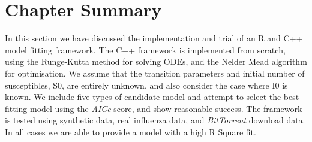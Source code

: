 \section{Chapter Summary}
In this section we have discussed the implementation and trial of an R
and C++ model fitting framework. The C++ framework is implemented from
scratch, using the Runge-Kutta method for solving ODEs, and the Nelder
Mead algorithm for optimisation. We assume that the transition
parameters and initial number of susceptibles, S0, are entirely
unknown, and also consider the case where I0 is known. We include five types of candidate
model and attempt to select the best fitting model using the
\emph{AICc} score, and show reasonable success. The framework is
tested using synthetic data, real influenza data, and
\emph{BitTorrent} download data. In all cases we are able to provide a
model with a high R Square fit.
